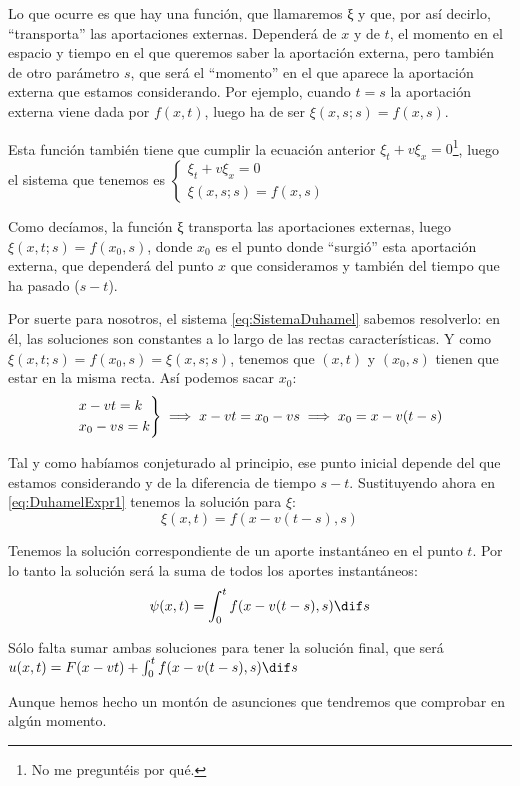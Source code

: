 			Lo que ocurre es que hay una función, que llamaremos ξ y que, por así decirlo, ``transporta'' las aportaciones externas. Dependerá de $x$ y de $t$, el momento en el espacio y tiempo en el que queremos saber la aportación externa, pero también de otro parámetro $s$, que será el ``momento'' en el que aparece la aportación externa que estamos considerando. Por ejemplo, cuando $t = s$ la aportación externa viene dada por $f(x,t)$, luego ha de ser $ξ(x,s; s) = f(x,s)$.

			Esta función también tiene que cumplir la ecuación anterior $ξ_t + v ξ_x = 0$\footnote{No me preguntéis por qué.}, luego el sistema que tenemos es \( \begin{cases}
			ξ_t + vξ_x = 0 \\
			ξ(x,s;s) = f(x,s)
			\end{cases} \label{eq:SistemaDuhamel} \)

			Como decíamos, la función ξ transporta las aportaciones externas, luego \( ξ(x,t; s) = f(x_0, s) \label{eq:DuhamelExpr1} \), donde $x_0$ es el punto donde ``surgió'' esta aportación externa, que dependerá del punto $x$ que consideramos y también del tiempo que ha pasado ($s-t$).

			Por suerte para nosotros, el sistema \eqref{eq:SistemaDuhamel} sabemos resolverlo: en él, las soluciones son constantes a lo largo de las rectas características. Y como $ξ(x,t;s) = f(x_0, s) = ξ(x,s;s)$, tenemos que $(x,t)$ y $(x_0, s)$ tienen que estar en la misma recta. Así podemos sacar $x_0$:
			\[
			\begin{rcases}
				x-vt = k\\
				x_0 - vs = k
			\end{rcases}
			 \implies x-vt = x_0 - vs \implies
			x_0 = x-v(t-s) \]

			Tal y como habíamos conjeturado al principio, ese punto inicial depende del que estamos considerando y de la diferencia de tiempo $s-t$. Sustituyendo ahora en \eqref{eq:DuhamelExpr1} tenemos la solución para $ξ$:
			\[ \xi(x,t) = f(x - v(t-s), s) \]

			Tenemos la solución correspondiente de un aporte instantáneo en el punto $t$. Por lo tanto la solución será la suma de todos los aportes instantáneos:
			\[  \psi(x,t) = \int^{t}_{0} f(x-v(t-s),s) \dif s \]

			Sólo falta sumar ambas soluciones para tener la solución final, que será \(
			u(x,t) = F(x-vt) + \int_0^t f(x-v(t-s),s) \dif s \label{eq:SolDuhamel} \)

			Aunque hemos hecho un montón de asunciones que tendremos que comprobar en algún momento.

